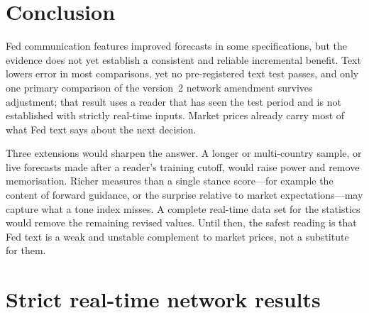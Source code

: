 \documentclass[11pt]{article}
\begin{document}
\section{Conclusion}\label{sec:concl}

Fed communication features improved forecasts in some specifications, but the evidence does not yet establish a
consistent and reliable incremental benefit. Text lowers error in most comparisons, yet no pre-registered text
test passes, and only one primary comparison of the version~2 network amendment survives adjustment; that result uses a reader that has seen the test period and is not established with strictly
real-time inputs. Market prices already carry most of what Fed text says about the next decision.

Three extensions would sharpen the answer. A longer or multi-country sample, or live forecasts made after a
reader's training cutoff, would raise power and remove memorisation. Richer measures than a single stance
score---for example the content of forward guidance, or the surprise relative to market expectations---may
capture what a tone index misses. A complete real-time data set for the statistics would remove the remaining
revised values. Until then, the safest reading is that Fed text is a weak and unstable complement to market
prices, not a substitute for them.




\appendix
\clearpage
\section{Strict real-time network results}\label{app:strict}
\end{document}
